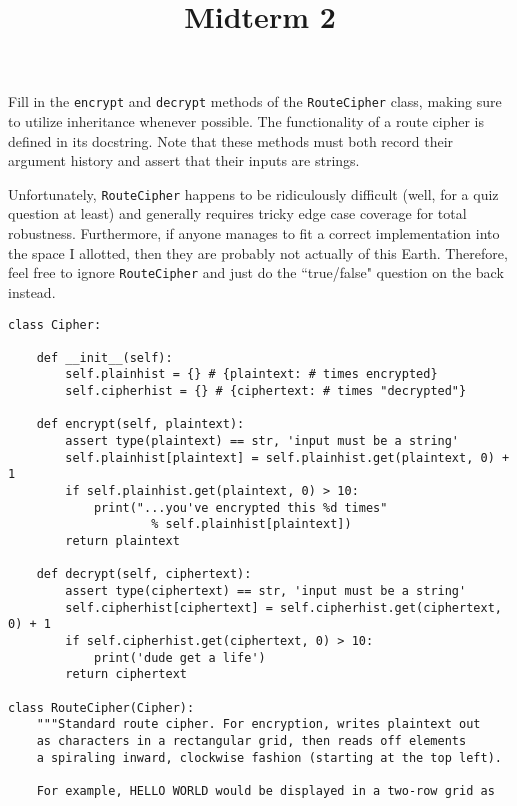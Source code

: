 \documentclass[twoside]{article}
\title{\sc Midterm 2}
\begin{document}
\thispagestyle{empty}
\maketitle

\begin{enumerate}

Fill in the \texttt{encrypt} and \texttt{decrypt} methods of the \texttt{RouteCipher} class, making sure to utilize inheritance whenever possible. The functionality of a route cipher is defined in its docstring. Note that these methods must both record their argument history and assert that their inputs are strings.

Unfortunately, \texttt{RouteCipher} happens to be ridiculously difficult (well, for a quiz question at least) and generally requires tricky edge case coverage for total robustness. Furthermore, if anyone manages to fit a correct implementation into the space I allotted, then they are probably not actually of this Earth. Therefore, feel free to ignore \texttt{RouteCipher} and just do the ``true/false" question on the back instead.
\vspace{0.1in}

\begin{lstlisting}
class Cipher:

    def __init__(self):
        self.plainhist = {} # {plaintext: # times encrypted}
        self.cipherhist = {} # {ciphertext: # times "decrypted"}
        
    def encrypt(self, plaintext):
        assert type(plaintext) == str, 'input must be a string'
        self.plainhist[plaintext] = self.plainhist.get(plaintext, 0) + 1
        if self.plainhist.get(plaintext, 0) > 10:
            print("...you've encrypted this %d times"
                    % self.plainhist[plaintext])
        return plaintext
    
    def decrypt(self, ciphertext):
        assert type(ciphertext) == str, 'input must be a string'
        self.cipherhist[ciphertext] = self.cipherhist.get(ciphertext, 0) + 1
        if self.cipherhist.get(ciphertext, 0) > 10:
            print('dude get a life')
        return ciphertext

class RouteCipher(Cipher):
    """Standard route cipher. For encryption, writes plaintext out
    as characters in a rectangular grid, then reads off elements
    a spiraling inward, clockwise fashion (starting at the top left).
    
    For example, HELLO WORLD would be displayed in a two-row grid as
    

\end{lstlisting}
\end{enumerate}
\end{document}
